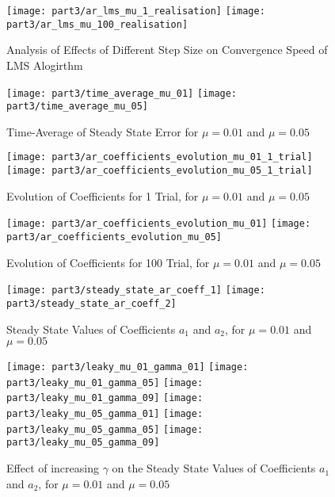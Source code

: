 \begin{figure}[H]
\centering{}
\texttt{[image: part3/ar\_lms\_mu\_1\_realisation]}
\texttt{[image: part3/ar\_lms\_mu\_100\_realisation]}
\caption{Analysis of Effects of Different Step Size on Convergence Speed of LMS Alogirthm}
\end{figure}

\begin{figure}[H]
\centering{}
\texttt{[image: part3/time\_average\_mu\_01]}
\texttt{[image: part3/time\_average\_mu\_05]}
\caption{Time-Average of Steady State Error for $\mu=0.01$ and $\mu=0.05$}
\end{figure}


\begin{figure}[H]
\centering{}
\texttt{[image: part3/ar\_coefficients\_evolution\_mu\_01\_1\_trial]}
\texttt{[image: part3/ar\_coefficients\_evolution\_mu\_05\_1\_trial]}
\caption{Evolution of Coefficients for 1 Trial, for $\mu=0.01$ and $\mu=0.05$}
\end{figure}


\begin{figure}[H]
\centering{}
\texttt{[image: part3/ar\_coefficients\_evolution\_mu\_01]}
\texttt{[image: part3/ar\_coefficients\_evolution\_mu\_05]}
\caption{Evolution of Coefficients for 100 Trial, for $\mu=0.01$ and $\mu=0.05$}
\end{figure}

\begin{figure}[H]
\centering{}
\texttt{[image: part3/steady\_state\_ar\_coeff\_1]}
\texttt{[image: part3/steady\_state\_ar\_coeff\_2]}
\caption{Steady State Values of Coefficients $a_1$ and $a_2$, for $\mu=0.01$ and $\mu=0.05$}
\end{figure}

\begin{figure}[H]
\centering{}
\texttt{[image: part3/leaky\_mu\_01\_gamma\_01]}
\texttt{[image: part3/leaky\_mu\_01\_gamma\_05]}
\texttt{[image: part3/leaky\_mu\_01\_gamma\_09]}
\texttt{[image: part3/leaky\_mu\_05\_gamma\_01]}
\texttt{[image: part3/leaky\_mu\_05\_gamma\_05]}
\texttt{[image: part3/leaky\_mu\_05\_gamma\_09]}
\caption{Effect of increasing $\gamma$ on the Steady State Values of Coefficients $a_1$ and $a_2$, for $\mu=0.01$ and $\mu=0.05$}
\end{figure}


